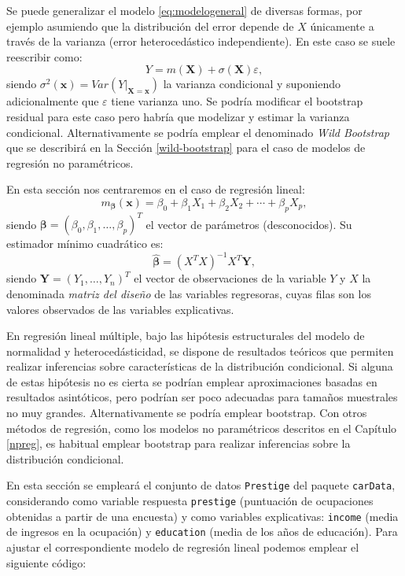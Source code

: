 \documentclass[
]{book}
\theoremstyle{break}
\theoremstyle{definition}
\theoremstyle{definition}
\theoremstyle{definition}
\theoremstyle{definition}
\theoremstyle{remark}
\begin{document}
Se puede generalizar el modelo \eqref{eq:modelogeneral} de diversas formas, por ejemplo asumiendo que la distribución del error depende de \(X\) únicamente a través de la varianza (error heterocedástico independiente).
En este caso se suele reescribir como:
\[Y = m(\mathbf{X}) + \sigma(\mathbf{X}) \varepsilon,\]
siendo \(\sigma^2(\mathbf{x}) = Var\left( \left. Y\right\vert_{\mathbf{X}=\mathbf{x}} \right)\) la varianza condicional y suponiendo adicionalmente que \(\varepsilon\) tiene varianza uno.
Se podría modificar el bootstrap residual para este caso pero habría que modelizar y estimar la varianza condicional.
Alternativamente se podría emplear el denominado \emph{Wild Bootstrap} que se describirá en la Sección \ref{wild-bootstrap} para el caso de modelos de regresión no paramétricos.

En esta sección nos centraremos en el caso de regresión lineal:
\[m_{\boldsymbol{\beta}}(\mathbf{x}) =  \beta_{0} + \beta_{1}X_{1} + \beta_{2}X_{2} + \cdots + \beta_{p}X_{p},\]
siendo \(\boldsymbol{\beta} = \left( \beta_{0}, \beta_{1}, \ldots, \beta_{p} \right)^{T}\) el vector de parámetros (desconocidos).
Su estimador mínimo cuadrático es:
\[\boldsymbol{\hat{\beta}} = \left( X^{T}X\right)^{-1}X^{T}\mathbf{Y},\]
siendo \(\mathbf{Y} = \left( Y_{1}, \ldots, Y_{n} \right)^{T}\) el vector de observaciones de la variable \(Y\) y \(X\) la denominada \emph{matriz del diseño} de las variables regresoras, cuyas filas son los valores observados de las variables explicativas.

En regresión lineal múltiple, bajo las hipótesis estructurales del modelo de normalidad y heterocedásticidad, se dispone de resultados teóricos que permiten realizar inferencias sobre características de la distribución condicional. Si alguna de estas hipótesis no es cierta se podrían emplear aproximaciones basadas en resultados asintóticos, pero podrían ser poco adecuadas para tamaños muestrales no muy grandes. Alternativamente se podría emplear bootstrap.
Con otros métodos de regresión, como los modelos no paramétricos descritos en el Capítulo \ref{npreg}, es habitual emplear bootstrap para realizar inferencias sobre la distribución condicional.

En esta sección se empleará el conjunto de datos \texttt{Prestige} del paquete \texttt{carData}, considerando como variable respuesta \texttt{prestige} (puntuación de ocupaciones obtenidas a partir de una encuesta) y como variables explicativas: \texttt{income} (media de ingresos en la ocupación) y \texttt{education} (media de los años de educación).
Para ajustar el correspondiente modelo de regresión lineal podemos emplear el siguiente código:
\end{document}
